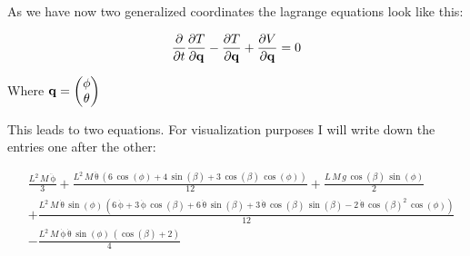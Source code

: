 

As we have now two generalized coordinates the lagrange equations look like this:

\begin{equation}
    \begin{split}
        \frac{\partial}{\partial t}\frac{\partial T}{\partial  \text{\textbf{q}}} - \frac{\partial T}{\partial \text{\textbf{q}}} + \frac{\partial V}{\partial \text{\textbf{q}}} = 0
    \end{split}
\end{equation}

Where $\text{\textbf{q}} = \begin{pmatrix}
    \phi\\
    \theta
\end{pmatrix}$

This leads to two equations. For visualization purposes I will write down the entries one after the other:

\begin{equation}
    \begin{split}
        &\frac{L^2\,M\,\mathrm{\ddot \phi}}{3}+\frac{L^2\,M\,\mathrm{\ddot  \theta}\,\left(6\,\cos\left(\phi \right)+4\,\sin\left(\beta \right)+3\,\cos\left(\beta \right)\,\cos\left(\phi \right)\right)}{12}+\frac{L\,M\,g\,\cos\left(\beta \right)\,\sin\left(\phi \right)}{2}\\
        &+\frac{L^2\,M\,\mathrm{\dot  \theta}\,\sin\left(\phi \right)\,\left(6\,\mathrm{\dot \phi}+3\,\mathrm{\dot \phi}\,\cos\left(\beta \right)+6\,\mathrm{\dot  \theta}\,\sin\left(\beta \right)+3\,\mathrm{\dot  \theta}\,\cos\left(\beta \right)\,\sin\left(\beta \right)-2\,\mathrm{\dot  \theta}\,{\cos\left(\beta \right)}^2\,\cos\left(\phi \right)\right)}{12}\\
        &-\frac{L^2\,M\,\mathrm{\dot \phi}\,\mathrm{\dot  \theta}\,\sin\left(\phi \right)\,\left(\cos\left(\beta \right)+2\right)}{4}
    \end{split}
\end{equation}

